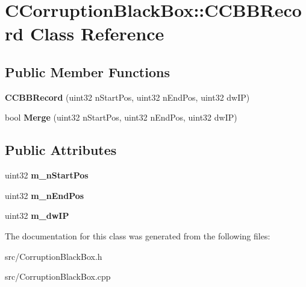 \section{CCorruptionBlackBox::CCBBRecord Class Reference}
\label{classCCorruptionBlackBox_1_1CCBBRecord}
\subsection*{Public Member Functions}
\begin{DoxyCompactItemize}
\item 
{\bfseries CCBBRecord} (uint32 nStartPos, uint32 nEndPos, uint32 dwIP)\label{classCCorruptionBlackBox_1_1CCBBRecord_ab3f20b9ba2d4b6bfff00fdfb0d49e9db}

\item 
bool {\bfseries Merge} (uint32 nStartPos, uint32 nEndPos, uint32 dwIP)\label{classCCorruptionBlackBox_1_1CCBBRecord_a8fb3b1d133674b3d9cc25f9eb43a4019}

\end{DoxyCompactItemize}
\subsection*{Public Attributes}
\begin{DoxyCompactItemize}
\item 
uint32 {\bfseries m\_\-nStartPos}\label{classCCorruptionBlackBox_1_1CCBBRecord_a56ff1c3fc00ccaadbc86946d03576df3}

\item 
uint32 {\bfseries m\_\-nEndPos}\label{classCCorruptionBlackBox_1_1CCBBRecord_a9ed7668ca836ea8c601a367d7d538782}

\item 
uint32 {\bfseries m\_\-dwIP}\label{classCCorruptionBlackBox_1_1CCBBRecord_a7c3ea4c24fc8eea3e370bd9c49ce67d3}

\end{DoxyCompactItemize}


The documentation for this class was generated from the following files:\begin{DoxyCompactItemize}
\item 
src/CorruptionBlackBox.h\item 
src/CorruptionBlackBox.cpp\end{DoxyCompactItemize}
